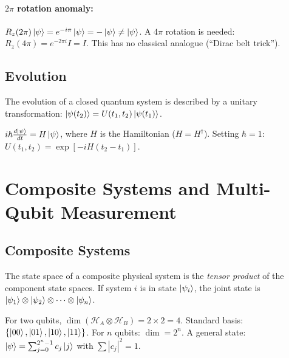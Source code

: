 \documentclass[10pt,a4paper]{article}
\begin{document}
\paragraph{$2\pi$ rotation anomaly:} $R_z(2\pi)\ket{\psi}=e^{-i\pi}\ket{\psi}=-\ket{\psi}\neq\ket{\psi}$. A $4\pi$ rotation is needed: $R_z(4\pi)=e^{-2\pi i}I=I$. This has no classical analogue (``Dirac belt trick'').

\subsection{Evolution}

\begin{tcolorbox}[propstyle, title={Postulate}]
The evolution of a closed quantum system is described by a unitary transformation: $\ket{\psi(t_2)}=U(t_1,t_2)\ket{\psi(t_1)}$.
\end{tcolorbox}

\begin{tcolorbox}[propstyle, title={Schr\"odinger Equation}]
$i\hbar\frac{d\ket{\psi}}{dt}=H\ket{\psi}$, where $H$ is the Hamiltonian ($H=H^\dagger$). Setting $\hbar=1$: $U(t_1,t_2)=\exp[-iH(t_2-t_1)]$.
\end{tcolorbox}
\section{Composite Systems and Multi-Qubit Measurement}

\subsection{Composite Systems}

\begin{tcolorbox}[propstyle, title={Postulate}]
The state space of a composite physical system is the \emph{tensor product} of the component state spaces. If system $i$ is in state $\ket{\psi_i}$, the joint state is $\ket{\psi_1}\otimes\ket{\psi_2}\otimes\cdots\otimes\ket{\psi_n}$.
\end{tcolorbox}

For two qubits, $\dim(\mathcal{H}_A\otimes\mathcal{H}_B)=2\times 2=4$. Standard basis: $\{\ket{00},\ket{01},\ket{10},\ket{11}\}$. For $n$ qubits: $\dim=2^n$. A general state: $\ket{\psi}=\sum_{j=0}^{2^n-1}c_j\ket{j}$ with $\sum|c_j|^2=1$.
\end{document}
